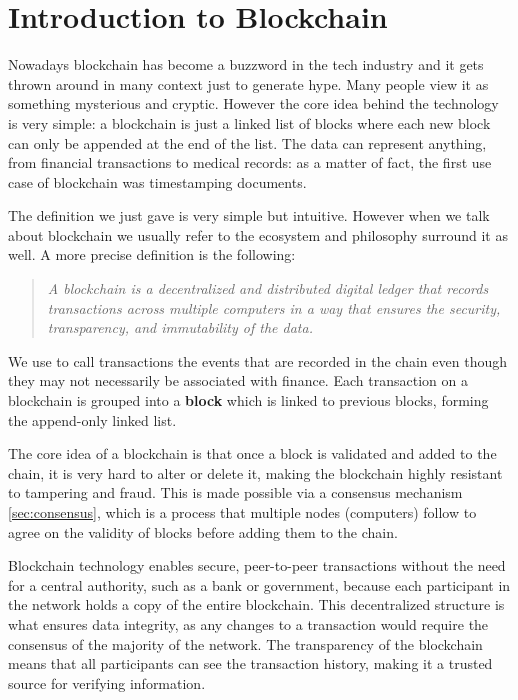 \section{Introduction to Blockchain}
Nowadays blockchain has become a buzzword in the tech industry and it gets thrown around in many context just
to generate hype. Many people view it as something mysterious and cryptic.
However the core idea behind the technology is very simple: a blockchain is just a linked list of blocks
where each new block can only be appended at the end of the list. The data can represent anything, from
financial transactions to medical records: as a matter of fact, the first use case of
blockchain was timestamping documents.

The definition we just gave is very simple but intuitive. However when we talk about blockchain we usually
refer to the ecosystem and philosophy surround it as well. A more precise definition is the following:
\begin{quote}
  \it A blockchain is a decentralized and distributed
  digital ledger that records \textit{transactions} across multiple
  computers in a way that ensures the security, transparency, and immutability of the data.
\end{quote}

We use to call transactions the events that are recorded in the chain even though they may not necessarily be
associated with finance. Each transaction on a blockchain is grouped into a \textbf{block} which is linked to
previous blocks, forming the append-only linked list.

The core idea of a blockchain is that once a block is validated and added to the chain, it is very hard to
alter or delete it, making the blockchain highly resistant to tampering and fraud.
This is made possible via a consensus mechanism \ref{sec:consensus}, which is a process that multiple nodes
(computers) follow to agree on the validity of blocks before adding them to the chain.

Blockchain technology enables secure, peer-to-peer transactions without the need for a central authority,
such as a bank or government, because each participant in the network holds a copy of the entire blockchain.
This decentralized structure is what ensures data integrity, as any changes to a transaction would require
the consensus of the majority of the network.
The transparency of the blockchain means that all participants can see the transaction history, making it a
trusted source for verifying information.

